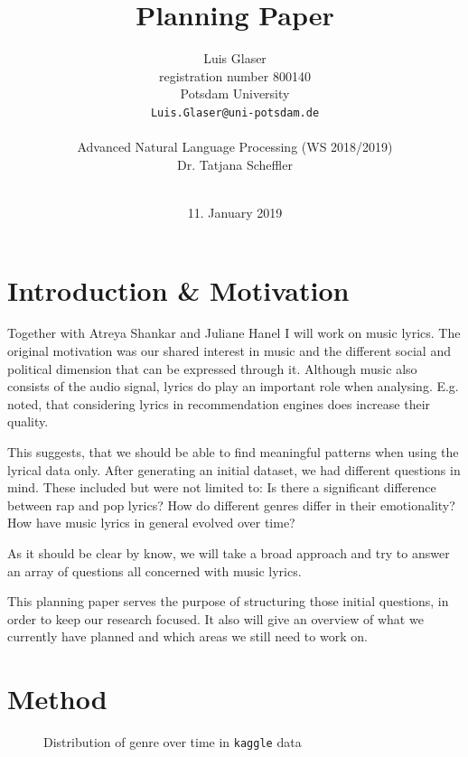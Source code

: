 \documentclass[11pt,a4paper]{article}
\title{Planning Paper}
\author{Luis Glaser\\
  registration number 800140 \\
  Potsdam University \\
  {\tt Luis.Glaser@uni-potsdam.de} \\
  \\
  Advanced Natural Language Processing (WS 2018/2019) \\
  Dr. Tatjana Scheffler \\
  \\}
\date{11. January 2019}
\begin{document}
\maketitle

\thispagestyle{plain}

\section*{Introduction \& Motivation}

Together with Atreya Shankar and Juliane Hanel I will work on music lyrics. The original motivation was our shared interest in music and the different social and political dimension that can be expressed through it. Although music also consists of the audio signal, lyrics do play an important role when analysing. E.g. \citet{fell_lyrics-based_2014} noted, that considering lyrics in recommendation engines does increase their quality.

This suggests, that we should be able to find meaningful patterns when using the lyrical data only. After generating an initial dataset, we had different questions in mind. These included but were not limited to: Is there a significant difference between rap and pop lyrics? How do different genres differ in their emotionality? How have music lyrics in general evolved over time? 

As it should be clear by know, we will take a broad approach and try to answer an array of questions all concerned with music lyrics.

This planning paper serves the purpose of structuring those initial questions, in order to keep our research focused. It also will give an overview of what we currently have planned and which areas we still need to work on. 

\section*{Method}\label{sec:method}
\begin{figure}[h]
	\centering
	\caption{Distribution of genre over time in \texttt{kaggle} data}
       \label{fig:kaggle}
\end{figure}
\end{document}
